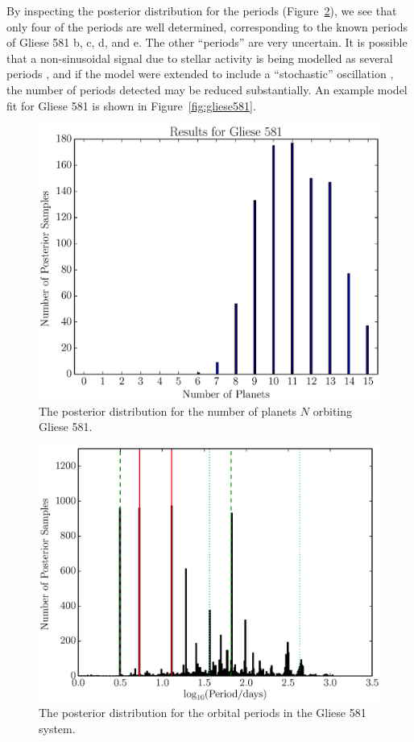 \documentclass[useAMS,usenatbib]{mn2e}
\begin{document}
By inspecting the posterior distribution for the periods
(Figure~\ref{fig:gliese581_periods}), we see that only four of the periods
are well determined, corresponding to the known periods of Gliese 581 b, c, d,
and e. The other ``periods'' are very uncertain. It is possible that a
non-sinusoidal signal due to stellar activity is being modelled as several
periods \citep{astero}, and if the model were extended to include a ``stochastic''
oscillation \citep{gaussproc}, the number of periods detected may be reduced
substantially. An example model fit for Gliese 581 is shown in
Figure~\ref{fig:gliese581}.

\begin{figure}
\includegraphics[scale=0.45]{Figures/gliese581_N.eps}
\caption{The posterior distribution for the number of planets $N$ orbiting
Gliese 581.\label{fig:gliese581_N}}
\end{figure}

\begin{figure}
\includegraphics[scale=0.45]{Figures/gliese581_periods.eps}
\caption{The posterior distribution for the orbital periods in the Gliese 581
system.\label{fig:gliese581_periods}}
\end{figure}
\end{document}
